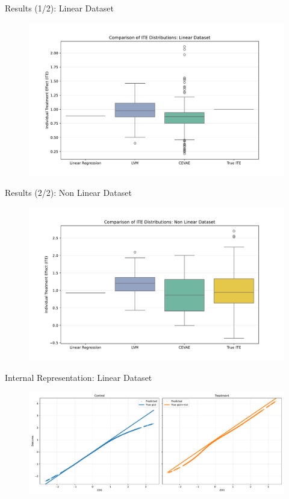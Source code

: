 \documentclass[10pt]{beamer}
\begin{document}
\begin{frame}{Results (1/2): Linear Dataset}
    \begin{figure}[H]
      \includegraphics[width=\textwidth]{images/boxplot_linear.pdf}
    \end{figure}
\end{frame}

\begin{frame}{Results (2/2): Non Linear Dataset}
    \begin{figure}[H]
      \includegraphics[width=\textwidth]{images/boxplot_non_linear.pdf}
    \end{figure}
\end{frame}

\begin{frame}{Internal Representation: Linear Dataset}
  \begin{figure}[H]
    \includegraphics[width=\textwidth]{../src/results/linear_predicted_vs_true.pdf}
  \end{figure}  
\end{frame}
\end{document}
